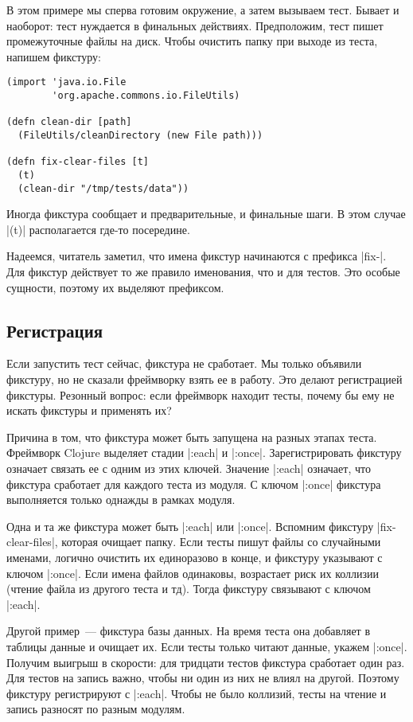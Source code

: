 В этом примере мы сперва готовим окружение, а затем вызываем тест. Бывает и
наоборот: тест нуждается в финальных действиях. Предположим, тест пишет
промежуточные файлы на диск. Чтобы очистить папку при выходе из теста, напишем
фикстуру:

\begin{verbatim}
(import 'java.io.File
        'org.apache.commons.io.FileUtils)

(defn clean-dir [path]
  (FileUtils/cleanDirectory (new File path)))

(defn fix-clear-files [t]
  (t)
  (clean-dir "/tmp/tests/data"))
\end{verbatim}

Иногда фикстура сообщает и предварительные, и финальные шаги. В этом случае
\spverb|(t)| располагается где-то посередине.

Надеемся, читатель заметил, что имена фикстур начинаются с префикса
\spverb|fix-|. Для фикстур действует то же правило именования, что и для
тестов. Это особые сущности, поэтому их выделяют префиксом.

\subsection{Регистрация}

Если запустить тест сейчас, фикстура не сработает. Мы только объявили фикстуру,
но не сказали фреймворку взять ее в работу. Это делают регистрацией фикстуры.
Резонный вопрос: если фреймворк находит тесты, почему бы ему не искать фикстуры
и применять их?

Причина в том, что фикстура может быть запущена на разных этапах
теста. Фреймворк Clojure выделяет стадии \spverb|:each| и
\spverb|:once|. Зарегистрировать фикстуру означает связать ее с одним из этих
ключей. Значение \spverb|:each| означает, что фикстура сработает для каждого
теста из модуля. С ключом \spverb|:once| фикстура выполняется только однажды в
рамках модуля.

Одна и та же фикстура может быть \spverb|:each| или \spverb|:once|. Вспомним
фикстуру \spverb|fix-clear-files|, которая очищает папку. Если тесты пишут файлы
со случайными именами, логично очистить их единоразово в конце, и фикстуру
указывают с ключом \spverb|:once|. Если имена файлов одинаковы, возрастает риск
их коллизии (чтение файла из другого теста и тд). Тогда фикстуру связывают с
ключом \spverb|:each|.

Другой пример~--- фикстура базы данных. На время теста она добавляет в таблицы
данные и очищает их. Если тесты только читают данные, укажем
\spverb|:once|. Получим выигрыш в скорости: для тридцати тестов фикстура
сработает один раз. Для тестов на запись важно, чтобы ни один из них не влиял на
другой. Поэтому фикстуру регистрируют с \spverb|:each|. Чтобы не было коллизий,
тесты на чтение и запись разносят по разным модулям.

